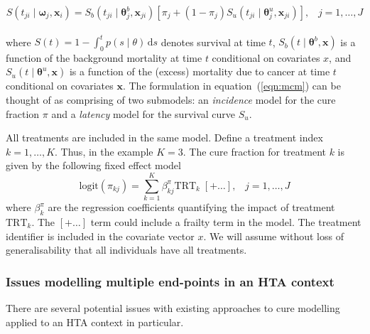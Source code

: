 \documentclass[AMA,STIX1COL]{WileyNJD-v2}
\begin{document}
\begin{equation}
\label{eqn:mcm}
S(t_{ji} \mid \bm\omega_j, \bm{x}_i) = S_b(t_{ji} \mid \bm\theta^b_j, \bm{x}_{ji}) \left[\pi_j + (1 - \pi_j) S_u(t_{ji} \mid \bm\theta^u_j, \bm{x}_{ji}) \right], \;\;\; j = 1, \ldots, J
\end{equation}
\\
\noindent
where $S(t) = 1 \!-\! \int_0^t p(s \mid \theta)\, \text{d}s$ denotes survival at time $t$,
$S_b(t \mid \bm\theta^b, \bm{x})$ is a function of the background mortality at time $t$ conditional on covariates $x$,
and $S_u(t \mid \bm\theta^u, \bm{x})$ is a function of the (excess) mortality due to cancer at time $t$ conditional on covariates $\bm{x}$.
The formulation in equation~(\ref{eqn:mcm}) can be thought of as comprising of two submodels: an \textit{incidence} model for the cure fraction $\pi$ and a \textit{latency} model for the survival curve $S_u$. 

All treatments are included in the same model. Define a treatment index $k = 1, \ldots, K$.
Thus, in the example $K=3$.
The cure fraction for treatment $k$ is given by the following fixed effect model
\begin{equation}
\label{eqn:pi_regn}
\mbox{logit}(\pi_{kj}) = \sum_{k=1}^K \beta^{\pi}_{kj} \mbox{TRT}_k \;[+ \ldots], \;\;\; j = 1, \ldots, J
\end{equation}
\noindent
where $\beta^{\pi}_k$ are the regression coefficients quantifying the impact of treatment $\mbox{TRT}_k$.
The $[+ \ldots]$ term could include a frailty term in the model.
The treatment identifier is included in the covariate vector $x$.
We will assume without loss of generalisability that all individuals have all treatments.


\subsubsection{Issues modelling multiple end-points in an HTA context} \label{section:issues}
There are several potential issues with existing approaches to cure modelling applied to an HTA context in particular.
\end{document}
